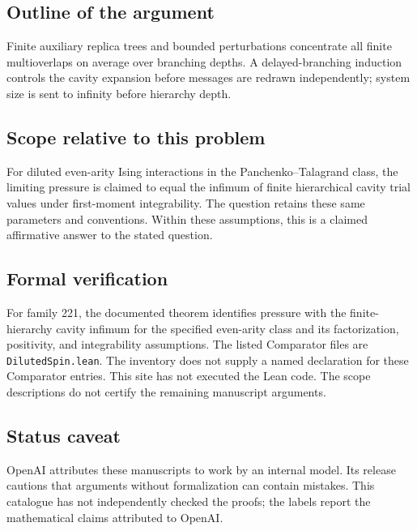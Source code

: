 \documentclass[11pt]{article}
\begin{document}
\subsection{Outline of the argument}
Finite auxiliary replica trees and bounded perturbations concentrate all finite multioverlaps on average over branching depths. A delayed-branching induction controls the cavity expansion before messages are redrawn independently; system size is sent to infinity before hierarchy depth.

\subsection{Scope relative to this problem}
For diluted even-arity Ising interactions in the Panchenko--Talagrand class, the limiting pressure is claimed to equal the infimum of finite hierarchical cavity trial values under first-moment integrability. The question retains these same parameters and conventions. Within these assumptions, this is a claimed affirmative answer to the stated question.

\subsection{Formal verification}
For family 221, the documented theorem identifies pressure with the finite-hierarchy cavity infimum for the specified even-arity class and its factorization, positivity, and integrability assumptions. The listed Comparator files are \texttt{DilutedSpin.lean}. The inventory does not supply a named declaration for these Comparator entries. This site has not executed the Lean code. The scope descriptions do not certify the remaining manuscript arguments.

\subsection{Status caveat}
OpenAI attributes these manuscripts to work by an internal model. Its release cautions that arguments without formalization can contain mistakes. This catalogue has not independently checked the proofs; the labels report the mathematical claims attributed to OpenAI.
\end{document}
